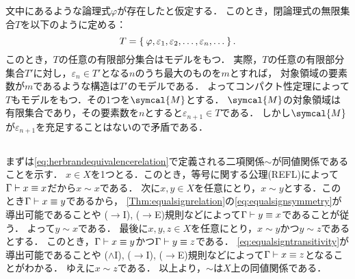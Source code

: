 \subsection*{}

文中にあるような論理式\(\varphi\)が存在したと仮定する．
このとき，閉論理式の無限集合\(T\)を以下のように定める：
\[
	T = \Set{\varphi,\varepsilon_1,\varepsilon_2,\dots,\varepsilon_n,\dots}.
\]
このとき，\(T\)の任意の有限部分集合はモデルをもつ．
実際，\(T\)の任意の有限部分集合\(T'\)に対し，\(\varepsilon_n \in T'\)となる\(n\)のうち最大のものを\(m\)とすれば，
対象領域の要素数が\(m\)であるような構造は\(T'\)のモデルである．
よってコンパクト性定理によって\(T\)もモデルをもつ．その1つを\(\symcal{M}\)とする．
\(\symcal{M}\)の対象領域は有限集合であり，その要素数を\(n\)とすると\(\varepsilon_{n+1} \in T\)である．
しかし\(\symcal{M}\)が\(\varepsilon_{n+1}\)を充足することはないので矛盾である．


\subsection*{}

まずは\cref{eq:herbrandequivalencerelation}で定義される二項関係\(\sim\)が同値関係であることを示す．
\(x \in X\)を1つとる．このとき，等号に関する公理(REFL)によって\(\Gamma \vdash x \equiv x\)だから\(x \sim x\)である．
次に\(x, y \in X\)を任意にとり，\(x \sim y\)とする．このとき\(\Gamma \vdash x \equiv y\)であるから，
\cref{Thm:equalsignrelation}の\cref{eq:equalsignsymmetry}が導出可能であることや
(\(\to\)I), (\(\to\)E)規則などによって\(\Gamma \vdash y \equiv x\)であることが従う．
よって\(y \sim x\)である．
最後に\(x, y, z \in X\)を任意にとり，\(x \sim y\)かつ\(y \sim z\)であるとする．
このとき，\(\Gamma \vdash x \equiv y\)かつ\(\Gamma \vdash y \equiv z\)である．
\cref{eq:equalsigntransitivity}が導出可能であることや
(\(\land\)I), (\(\to\)I), (\(\to\)E)規則などによって\(\Gamma \vdash x \equiv z\)となることがわかる．
ゆえに\(x \sim z\)である．
以上より，\(\sim\)は\(X\)上の同値関係である．

